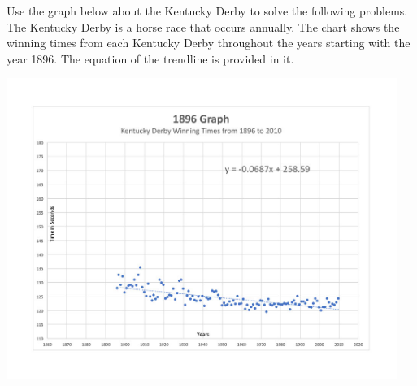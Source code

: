 \documentclass{ximera}
\author{David Kish}
\begin{document}
Use the graph below about the Kentucky Derby to solve the following problems.  The Kentucky Derby is a horse race that occurs annually.  The chart shows the winning times from each Kentucky Derby throughout the years starting with the year 1896. The equation of the trendline is provided in it.

\begin{image}
\includegraphics[width=5in]{1896graph.jpg}
\end{image}
\end{document}
